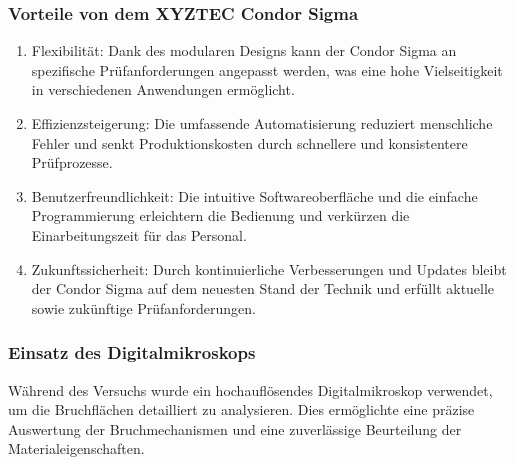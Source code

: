 \subsubsection{Vorteile von dem XYZTEC Condor Sigma}
\begin{enumerate}
    \item Flexibilität: Dank des modularen Designs kann der Condor Sigma an spezifische Prüfanforderungen angepasst werden, was eine hohe Vielseitigkeit in verschiedenen Anwendungen ermöglicht.
    \item Effizienzsteigerung: Die umfassende Automatisierung reduziert menschliche Fehler und senkt Produktionskosten durch schnellere und konsistentere Prüfprozesse.
    \item Benutzerfreundlichkeit: Die intuitive Softwareoberfläche und die einfache Programmierung erleichtern die Bedienung und verkürzen die Einarbeitungszeit für das Personal.
    \item Zukunftssicherheit: Durch kontinuierliche Verbesserungen und Updates bleibt der Condor Sigma auf dem neuesten Stand der Technik und erfüllt aktuelle sowie zukünftige Prüfanforderungen.
\end{enumerate}
\subsubsection{Einsatz des Digitalmikroskops}
Während des Versuchs wurde ein hochauflösendes Digitalmikroskop verwendet, um die Bruchflächen detailliert zu analysieren. Dies ermöglichte eine präzise Auswertung der Bruchmechanismen und eine zuverlässige Beurteilung der Materialeigenschaften.
